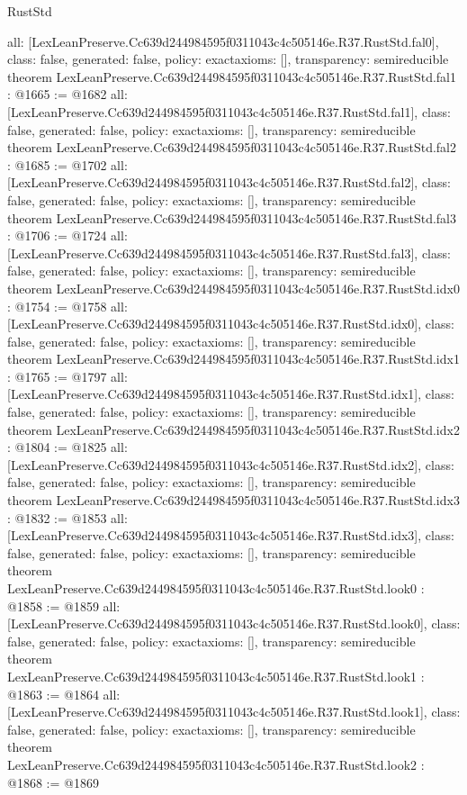 \begin{lexlean}{RustStd}
\begin{coremodule}
{  all: [LexLeanPreserve.Cc639d244984595f0311043c4c505146e.R37.RustStd.fal0],
  class: false,
  generated: false,
  policy: exact{axioms: []},
  transparency: semireducible
}
theorem LexLeanPreserve.Cc639d244984595f0311043c4c505146e.R37.RustStd.fal1 : @1665 := @1682 {
  all: [LexLeanPreserve.Cc639d244984595f0311043c4c505146e.R37.RustStd.fal1],
  class: false,
  generated: false,
  policy: exact{axioms: []},
  transparency: semireducible
}
theorem LexLeanPreserve.Cc639d244984595f0311043c4c505146e.R37.RustStd.fal2 : @1685 := @1702 {
  all: [LexLeanPreserve.Cc639d244984595f0311043c4c505146e.R37.RustStd.fal2],
  class: false,
  generated: false,
  policy: exact{axioms: []},
  transparency: semireducible
}
theorem LexLeanPreserve.Cc639d244984595f0311043c4c505146e.R37.RustStd.fal3 : @1706 := @1724 {
  all: [LexLeanPreserve.Cc639d244984595f0311043c4c505146e.R37.RustStd.fal3],
  class: false,
  generated: false,
  policy: exact{axioms: []},
  transparency: semireducible
}
theorem LexLeanPreserve.Cc639d244984595f0311043c4c505146e.R37.RustStd.idx0 : @1754 := @1758 {
  all: [LexLeanPreserve.Cc639d244984595f0311043c4c505146e.R37.RustStd.idx0],
  class: false,
  generated: false,
  policy: exact{axioms: []},
  transparency: semireducible
}
theorem LexLeanPreserve.Cc639d244984595f0311043c4c505146e.R37.RustStd.idx1 : @1765 := @1797 {
  all: [LexLeanPreserve.Cc639d244984595f0311043c4c505146e.R37.RustStd.idx1],
  class: false,
  generated: false,
  policy: exact{axioms: []},
  transparency: semireducible
}
theorem LexLeanPreserve.Cc639d244984595f0311043c4c505146e.R37.RustStd.idx2 : @1804 := @1825 {
  all: [LexLeanPreserve.Cc639d244984595f0311043c4c505146e.R37.RustStd.idx2],
  class: false,
  generated: false,
  policy: exact{axioms: []},
  transparency: semireducible
}
theorem LexLeanPreserve.Cc639d244984595f0311043c4c505146e.R37.RustStd.idx3 : @1832 := @1853 {
  all: [LexLeanPreserve.Cc639d244984595f0311043c4c505146e.R37.RustStd.idx3],
  class: false,
  generated: false,
  policy: exact{axioms: []},
  transparency: semireducible
}
theorem LexLeanPreserve.Cc639d244984595f0311043c4c505146e.R37.RustStd.look0 : @1858 := @1859 {
  all: [LexLeanPreserve.Cc639d244984595f0311043c4c505146e.R37.RustStd.look0],
  class: false,
  generated: false,
  policy: exact{axioms: []},
  transparency: semireducible
}
theorem LexLeanPreserve.Cc639d244984595f0311043c4c505146e.R37.RustStd.look1 : @1863 := @1864 {
  all: [LexLeanPreserve.Cc639d244984595f0311043c4c505146e.R37.RustStd.look1],
  class: false,
  generated: false,
  policy: exact{axioms: []},
  transparency: semireducible
}
theorem LexLeanPreserve.Cc639d244984595f0311043c4c505146e.R37.RustStd.look2 : @1868 := @1869 {
}
\end{coremodule}
\end{lexlean}
